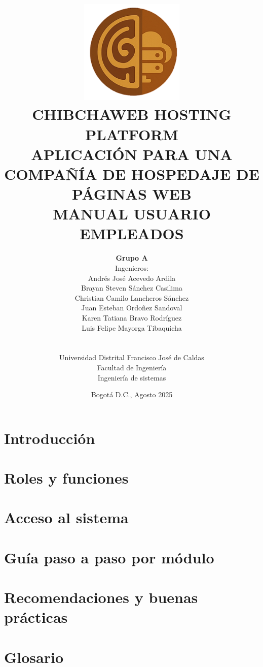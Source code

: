 \documentclass[a4paper, 12pt]{article}
\title{
\includegraphics[width=5cm]{logo.png}\\

{\Large CHIBCHAWEB HOSTING PLATFORM}\\
{\Large APLICACIÓN PARA UNA COMPAÑÍA DE HOSPEDAJE DE PÁGINAS WEB}\\[0.5em]

\textbf{MANUAL USUARIO EMPLEADOS}\\[0.5em]
}
\author{
\textbf{Grupo A}\\[0.5em]
Ingenieros:\\
Andrés José Acevedo Ardila\\
Brayan Steven Sánchez Casilima\\
Christian Camilo Lancheros Sánchez\\
Juan Esteban Ordoñez Sandoval\\
Karen Tatiana Bravo Rodríguez\\
Luis Felipe Mayorga Tibaquicha\\\\\\
Universidad Distrital Francisco José de Caldas\\
Facultad de Ingeniería\\
Ingeniería de sistemas\\
}
\date{Bogotá D.C., Agosto 2025}
\begin{document}
\maketitle
\newpage


\newpage
\tableofcontents

\newpage
\listoffigures

\newpage
\section{Introducción}


\newpage
\section{Roles y funciones}


\newpage
\section{Acceso al sistema}


\newpage
\section{Guía paso a paso por módulo}


\newpage
\section{Recomendaciones y buenas prácticas}


\newpage
\section{Glosario}




\end{document}
